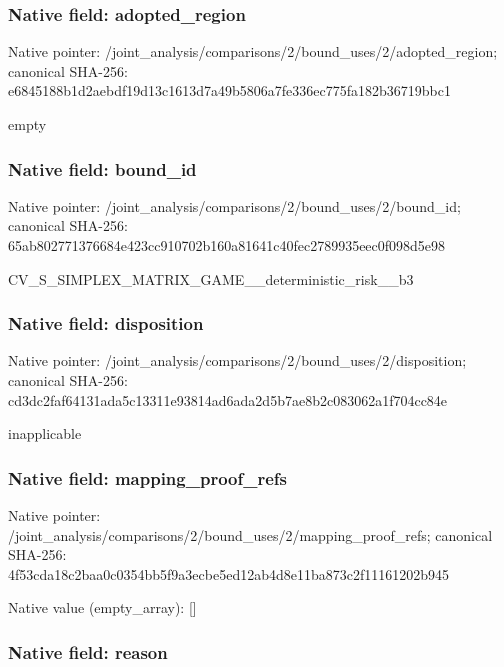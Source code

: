 \documentclass[10pt,a4paper]{article}
\begin{document}
\subsubsection{Native field: adopted\_region}


Native pointer: /joint\_analysis/comparis\allowbreak{}ons/2/bound\_uses/2/adopt\allowbreak{}ed\_region; canonical SHA-256: e6845188b1d2aebdf19d13c1\allowbreak{}613d7a49b5806a7fe336ec77\allowbreak{}5fa182b36719bbc1


empty


\subsubsection{Native field: bound\_id}


Native pointer: /joint\_analysis/comparis\allowbreak{}ons/2/bound\_uses/2/bound\allowbreak{}\_id; canonical SHA-256: 65ab802771376684e423cc91\allowbreak{}0702b160a81641c40fec2789\allowbreak{}935eec0f098d5e98


CV\_S\_SIMPLEX\_MATRIX\_GAME\allowbreak{}\_\_deterministic\_risk\_\_b3


\subsubsection{Native field: disposition}


Native pointer: /joint\_analysis/comparis\allowbreak{}ons/2/bound\_uses/2/dispo\allowbreak{}sition; canonical SHA-256: cd3dc2faf64131ada5c13311\allowbreak{}e93814ad6ada2d5b7ae8b2c0\allowbreak{}83062a1f704cc84e


inapplicable


\subsubsection{Native field: mapping\_proof\_refs}


Native pointer: /joint\_analysis/comparis\allowbreak{}ons/2/bound\_uses/2/mappi\allowbreak{}ng\_proof\_refs; canonical SHA-256: 4f53cda18c2baa0c0354bb5f\allowbreak{}9a3ecbe5ed12ab4d8e11ba87\allowbreak{}3c2f11161202b945



Native value (empty\_array): []



\subsubsection{Native field: reason}
\end{document}
